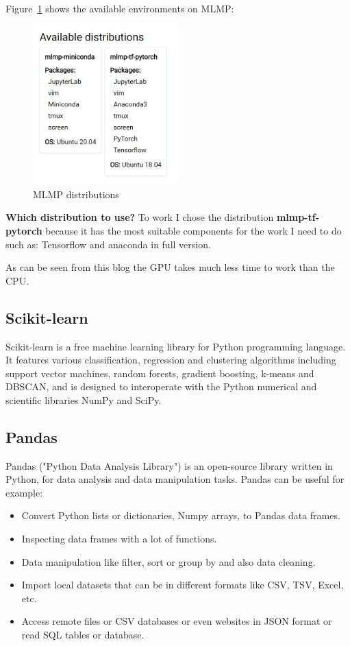 Figure~\ref{fig:fig_02} shows the available environments on \gls{MLMP}:
\begin{figure}[ht!]
\centering
\includegraphics[width=0.5\textwidth]{images/bfhmlmp.jpg}
\caption{\gls{MLMP} distributions}
\label{fig:fig_02}
\end{figure}
\FloatBarrier
\textbf{Which distribution to use?}
To work I chose the distribution \textbf{mlmp-tf-pytorch} because it has the most suitable components for the work I need to do such as: \gls{Tensorflow} and \gls{anaconda} in full version.

As can be seen from this blog \cite{giphy_blown_nodate} the GPU takes much less time to work than the CPU.

\subsection{Scikit-learn}
Scikit-learn \cite{noauthor_scikit-learn_nodate} is a free machine learning library for Python programming language. It features various classification, regression and clustering algorithms including support vector machines, random forests, gradient boosting, k-means and DBSCAN, and is designed to interoperate with the Python numerical and scientific libraries NumPy and SciPy.

\subsection{Pandas}
\gls{Pandas} \cite{noauthor_pandas_nodate} ("Python Data Analysis Library") is an open-source library written in Python, for data analysis and data manipulation tasks.
\gls{Pandas} can be useful for example:
\begin{itemize}
    \item Convert Python lists or dictionaries, Numpy arrays, to \gls{Pandas} data frames.
    \item Inspecting data frames with a lot of functions.
    \item Data manipulation like filter, sort or group by and also data cleaning.
    \item Import local datasets that can be in different formats like CSV, TSV, Excel, etc.
    \item Access remote files or CSV databases or even websites in JSON format or read SQL tables or database.
\end{itemize}

